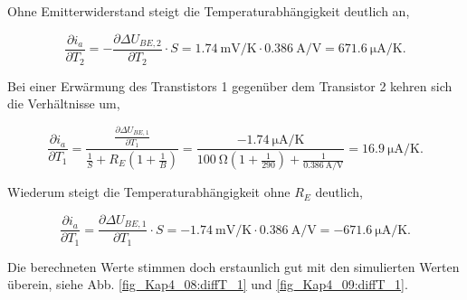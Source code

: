 Ohne Emitterwiderstand steigt die Temperaturabhängigkeit deutlich an,

\begin{equation}
    \frac{\partial i_a}{\partial T_2} = -\frac{\partial \Delta U_{BE,2}}{\partial T_2} \cdot S = \SI{1.74}{\milli\volt\per\kelvin} \cdot \SI{0,386}{\ampere\per\volt} = \SI{671.6}{\micro\ampere\per\kelvin} .
\end{equation}

Bei einer Erwärmung des Transtistors 1 gegenüber dem Transistor 2 kehren sich die Verhältnisse um, 

\begin{equation}
    \frac{\partial i_a}{\partial T_1} = \frac{\frac{\partial \Delta U_{BE,1}}{\partial T_1}}{\frac{1}{S} + R_E (1+\frac{1}{B})} = \frac{-\SI{1.74}{\micro\ampere\per\kelvin}}{\SI{100}{\ohm}(1 + \frac{1}{290}) + \frac{1}{\SI{0,386}{\ampere\per\volt}}} = \SI{16,9}{\micro\ampere\per\kelvin} .
\end{equation}

Wiederum steigt die Temperaturabhängigkeit ohne $R_E$ deutlich, 

\begin{equation}
    \frac{\partial i_a}{\partial T_1} = \frac{\partial \Delta U_{BE,1}}{\partial T_1} \cdot S = -\SI{1.74}{\milli\volt\per\kelvin} \cdot \SI{0,386}{\ampere\per\volt} = -\SI{671.6}{\micro\ampere\per\kelvin} .
\end{equation}

Die berechneten Werte stimmen doch erstaunlich gut mit den simulierten Werten überein, siehe Abb. \ref{fig_Kap4_08:diffT_1} und \ref{fig_Kap4_09:diffT_1}.